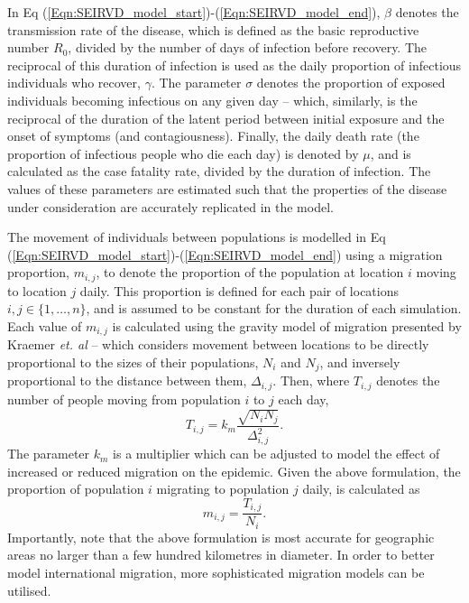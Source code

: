 \documentclass[10pt,letterpaper]{article}
\begin{document}
In Eq (\ref{Eqn:SEIRVD_model_start})-(\ref{Eqn:SEIRVD_model_end}), $\beta$ denotes the transmission rate of the disease, which is defined as the basic reproductive number $R_{0}$, divided by the number of days of infection before recovery. The reciprocal of this duration of infection is used as the daily proportion of infectious individuals who recover, $\gamma$. The parameter $\sigma$ denotes the proportion of exposed individuals becoming infectious on any given day -- which, similarly, is the reciprocal of the duration of the latent period between initial exposure and the onset of symptoms (and contagiousness). Finally, the daily death rate (the proportion of infectious people who die each day) is denoted by $\mu$, and is calculated as the case fatality rate, divided by the duration of infection. The values of these parameters are estimated such that the properties of the disease under consideration are accurately replicated in the model.

The movement of individuals between populations is modelled in Eq (\ref{Eqn:SEIRVD_model_start})-(\ref{Eqn:SEIRVD_model_end}) using a migration proportion, $m_{i,j}$, to denote the proportion of the population at location $i$ moving to location $j$ daily. This proportion is defined for each pair of locations $i,j \in \{1,\dots,n\}$, and is assumed to be constant for the duration of each simulation. Each value of $m_{i,j}$ is calculated using the gravity model of migration presented by Kraemer \textit{et. al} \cite{kraemer2019utilizing} -- which considers movement between locations to be directly proportional to the sizes of their populations, $N_{i}$ and $N_{j}$, and inversely proportional to the distance between them, $\Delta_{i,j}$.
Then, where $T_{i,j}$ denotes the number of people moving from population $i$ to $j$ each day, 
$$T_{i,j} = k_{m} \frac{\sqrt{N_{i} N_{j}}}{\Delta_{i,j}^{2}}.$$ 
The parameter $k_{m}$ is a multiplier which can be adjusted to model the effect of increased or reduced migration on the epidemic. Given the above formulation, the proportion of population $i$ migrating to population $j$ daily, is calculated as $$m_{i,j} = \frac{T_{i,j}}{N_{i}}.$$ 
Importantly, note that the above formulation is most accurate for geographic areas no larger than a few hundred kilometres in diameter. In order to better model international migration, more sophisticated migration models can be utilised.
\end{document}
